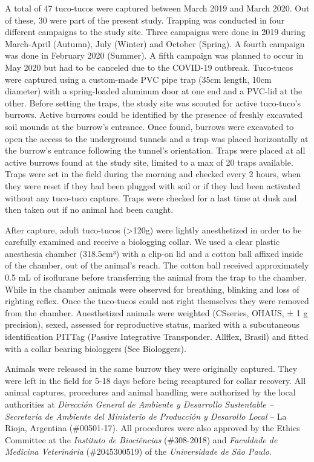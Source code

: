 \documentclass[english,msc,numbers,hidelinks]{coppe}
\begin{document}
  A total of 47 tuco-tucos were captured between March 2019 and March 2020. Out of these, 30 were part of the present study. Trapping was conducted in four different campaigns to the study site. Three campaigns were done in 2019 during March-April (Autumn), July (Winter) and October (Spring). A fourth campaign was done in February 2020 (Summer). A fifth campaign was planned to occur in May 2020 but had to be canceled due to the COVID-19 outbreak. Tuco-tucos were captured using a custom-made PVC pipe trap (35cm length, 10cm diameter) with a spring-loaded aluminum door at one end and a PVC-lid at the other. Before setting the traps, the study site was scouted for active tuco-tuco's burrows. Active burrows could be identified by the presence of freshly excavated soil mounds at the burrow's entrance. Once found, burrows were excavated to open the access to the underground tunnels and a trap was placed horizontally at the burrow's entrance following the tunnel's orientation. Traps were placed at all active burrows found at the study site, limited to a max of 20 traps available. Traps were set in the field during the morning and checked every 2 hours, when they were reset if they had been plugged with soil or if they had been activated without any tuco-tuco capture. Traps were checked for a last time at dusk and then taken out if no animal had been caught.

  After capture, adult tuco-tucos (\textgreater120g) were lightly anesthetized in order to be carefully examined and receive a biologging collar. We used a clear plastic anesthesia chamber (318.5cm³) with a clip-on lid and a cotton ball affixed inside of the chamber, out of the animal's reach. The cotton ball received approximately 0.5 mL of isoflurane before transferring the animal from the trap to the chamber. While in the chamber animals were observed for breathing, blinking and loss of righting reflex. Once the tuco-tucos could not right themselves they were removed from the chamber. Anesthetized animals were weighted (CSseries, OHAUS, ± 1 g precision), sexed, assessed for reproductive status, marked with a subcutaneous identification PITTag (Passive Integrative Transponder. Allflex, Brasil) and fitted with a collar bearing biologgers (See Biologgers).

  Animals were released in the same burrow they were originally captured. They were left in the field for 5-18 days before being recaptured for collar recovery. All animal captures, procedures and animal handling were authorized by the local authorities at \emph{Dirección General de Ambiente y Desarrollo Sustentable -- Secretaría de Ambiente del Ministerio de Producción y Desarollo Local} -- La Rioja, Argentina (\#00501-17). All procedures were also approved by the Ethics Committee at the \emph{Instituto de Biociências} (\#308-2018) and \emph{Faculdade de Medicina Veterinária} (\#2045300519) of the \emph{Universidade de São Paulo}.
\end{document}
